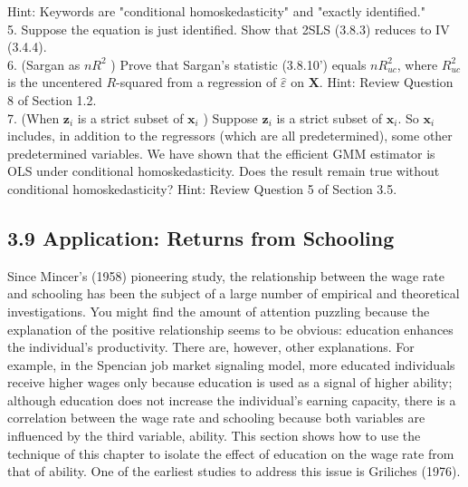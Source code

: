 \documentclass[10pt]{article}
\begin{document}
Hint: Keywords are "conditional homoskedasticity" and "exactly identified."\\
5. Suppose the equation is just identified. Show that 2SLS (3.8.3) reduces to IV (3.4.4).\\
6. (Sargan as $n R^{2}$ ) Prove that Sargan's statistic (3.8.10') equals $n R_{u c}^{2}$, where $R_{u c}^{2}$ is the uncentered $R$-squared from a regression of $\hat{\varepsilon}$ on $\mathbf{X}$. Hint: Review Question 8 of Section 1.2.\\
7. (When $\mathbf{z}_{i}$ is a strict subset of $\mathbf{x}_{i}$ ) Suppose $\mathbf{z}_{i}$ is a strict subset of $\mathbf{x}_{i}$. So $\mathbf{x}_{i}$ includes, in addition to the regressors (which are all predetermined), some other predetermined variables. We have shown that the efficient GMM estimator is OLS under conditional homoskedasticity. Does the result remain true without conditional homoskedasticity? Hint: Review Question 5 of Section 3.5.

\subsection*{3.9 Application: Returns from Schooling}
Since Mincer's (1958) pioneering study, the relationship between the wage rate and schooling has been the subject of a large number of empirical and theoretical investigations. You might find the amount of attention puzzling because the explanation of the positive relationship seems to be obvious: education enhances the individual's productivity. There are, however, other explanations. For example, in the Spencian job market signaling model, more educated individuals receive higher wages only because education is used as a signal of higher ability; although education does not increase the individual's earning capacity, there is a correlation between the wage rate and schooling because both variables are influenced by the third variable, ability. This section shows how to use the technique of this chapter to isolate the effect of education on the wage rate from that of ability. One of the earliest studies to address this issue is Griliches (1976).
\end{document}
